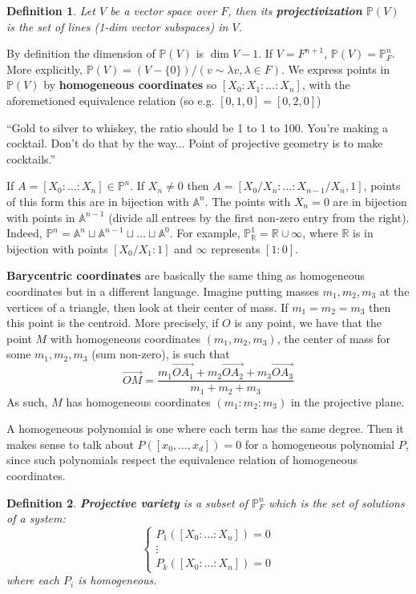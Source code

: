 \documentclass[12pt]{article}
\newcommand{\R}{\mathbb{R}}
\renewcommand{\P}{\mathbb{P}}
\newcommand{\A}{\mathbb{A}}
\renewcommand{\vec}{\overrightarrow}
\newtheorem{definition}{Definition}[section]
\begin{document}
    \begin{definition}
        Let $V$ be a vector space over $F$, then its \textbf{projectivization} $\P(V)$ is the set of lines (1-dim vector subspaces) in $V$.
    \end{definition}
    By definition the dimension of $\P(V)$ is $\dim V - 1$. If $V = F^{n+1}$, $\P(V) = \P_F^n$. More explicitly, $\P(V) = (V - \{0\})/(v \sim \lambda v, \lambda \in F)$.
    We express points in $\P(V)$ by \textbf{homogeneous coordinates} so $[X_0: X_1 : \dots : X_n]$, with the aforemetioned equivalence relation (so e.g. $[0, 1, 0] = [0, 2, 0]$) \par
    ``Gold to silver to whiskey, the ratio should be 1 to 1 to 100. You're making a cocktail. Don't do that by the way... Point of projective geometry is to make cocktails.''\par
    If $A = [X_0: \dots :X_n] \in \P^n$. If $X_n \neq 0$ then $A = [X_0/X_n: \dots : X_{n-1}/X_n, 1]$, points of this form this are in bijection with $\A^n$. The points with $X_n = 0$ are in bijection with points in $\A^{n-1}$ (divide all entrees by the first non-zero entry from the right). Indeed, $\P^n = \A^n \sqcup \A^{n-1} \sqcup \dots \sqcup \A^0$. For example, $\P_\R^1 = \R \cup \infty$, where $\R$ is in bijection with points $[X_0/X_1:1]$ and $\infty$ represents $[1:0]$.  \par
    \textbf{Barycentric coordinates} are basically the same thing as homogeneous coordinates but in a different language. Imagine putting masses $m_1, m_2, m_3$ at the vertices of a triangle, then look at their center of mass. If $m_1 = m_2 = m_3$ then this point is the centroid. More precisely, if $O$ is any point, we have that the point $M$ with homogeneous coordinates $(m_1, m_2, m_3)$, the center of mass for some $m_1, m_2, m_3$ (sum non-zero), is such that
    $$\vec{OM} = \frac{m_1\vec{OA_1} + m_2\vec{OA_2} + m_3\vec{OA_3}}{m_1 + m_2 + m_3}$$
    As such, $M$ has homogeneous coordinates $(m_1:m_2:m_3)$ in the projective plane.  \par
    A homogeneous polynomial is one where each term has the same degree. Then it makes sense to talk about $P([x_0, \dots, x_d]) = 0$ for a homogeneous polynomial $P$, since such polynomials respect the equivalence relation of homogeneous coordinates.
    \begin{definition}
        \textbf{Projective variety} is a subset of $\P_F^n$ which is the set of solutions of a system:
        $$\begin{cases}
            P_1([X_0: \dots : X_n]) = 0 \\
            \vdots \\
            P_k([X_0: \dots : X_n]) = 0
        \end{cases}$$
        where each $P_i$ is homogeneous.
    \end{definition}
\end{document}
